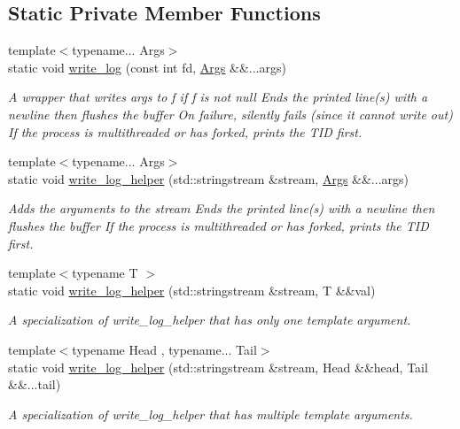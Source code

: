 \subsection*{Static Private Member Functions}
\begin{DoxyCompactItemize}
\item 
{\footnotesize template$<$typename... Args$>$ }\\static void \hyperlink{class_utilities_a0e04e18aadc16ac766d0e17145676455}{write\-\_\-log} (const int fd, \hyperlink{struct_args}{Args} \&\&...args)
\begin{DoxyCompactList}\small\item\em A wrapper that writes args to f if f is not null Ends the printed line(s) with a newline then flushes the buffer On failure, silently fails (since it cannot write out) If the process is multithreaded or has forked, prints the T\-I\-D first. \end{DoxyCompactList}\item 
{\footnotesize template$<$typename... Args$>$ }\\static void \hyperlink{class_utilities_a0763f59c16f6eb83b9c0e8abe014287a}{write\-\_\-log\-\_\-helper} (std\-::stringstream \&stream, \hyperlink{struct_args}{Args} \&\&...args)
\begin{DoxyCompactList}\small\item\em Adds the arguments to the stream Ends the printed line(s) with a newline then flushes the buffer If the process is multithreaded or has forked, prints the T\-I\-D first. \end{DoxyCompactList}\item 
{\footnotesize template$<$typename T $>$ }\\static void \hyperlink{class_utilities_ae816a2f7a656a433f6204687bff59a6c}{write\-\_\-log\-\_\-helper} (std\-::stringstream \&stream, T \&\&val)
\begin{DoxyCompactList}\small\item\em A specialization of write\-\_\-log\-\_\-helper that has only one template argument. \end{DoxyCompactList}\item 
{\footnotesize template$<$typename Head , typename... Tail$>$ }\\static void \hyperlink{class_utilities_a6b7a8d8b77768fde23f66d4f7a57c1c6}{write\-\_\-log\-\_\-helper} (std\-::stringstream \&stream, Head \&\&head, Tail \&\&...tail)
\begin{DoxyCompactList}\small\item\em A specialization of write\-\_\-log\-\_\-helper that has multiple template arguments. \end{DoxyCompactList}\end{DoxyCompactItemize}
